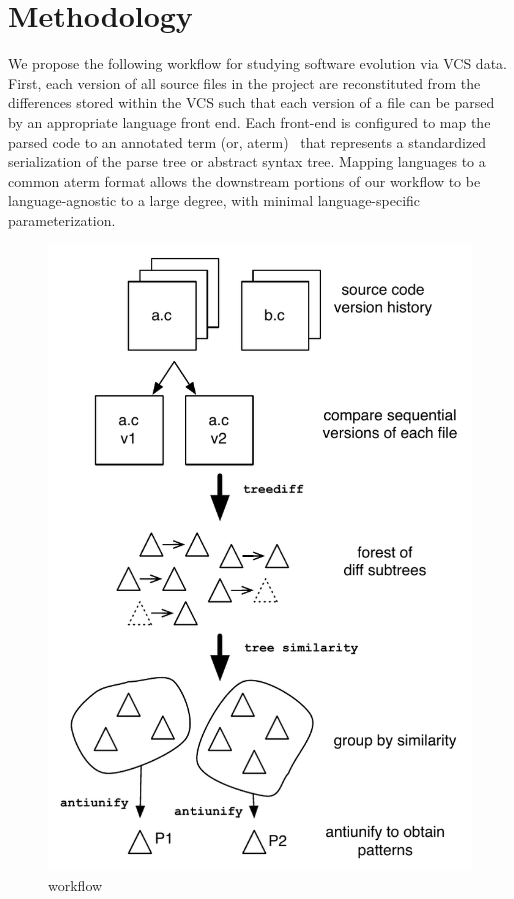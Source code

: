 
\section{Methodology}

We propose the following workflow for studying software evolution via VCS
data.  First, each version of all source files in the project are
reconstituted from the differences stored within the VCS such that each
version of a file can be parsed by an appropriate language front end.  Each
front-end is configured to map the parsed code to an annotated term (or,
aterm)~\cite{brand00aterm} that represents a standardized serialization of the
parse tree or abstract syntax tree.  Mapping languages to a common aterm
format allows the downstream portions of our workflow to be language-agnostic
to a large degree, with minimal language-specific parameterization.

\begin{figure}
\begin{center}
\includegraphics[height=0.44\textheight]{figures/workflow.pdf}
\caption{workflow}
\label{fig:workflow}
\end{center}
\end{figure}

